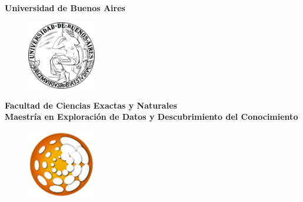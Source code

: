 \documentclass[runningheads,a4paper]{llncs}
\begin{document}
\mainmatter  %


\begin{titlepage}

\begin{center}
    
\textbf{\LARGE{Universidad de Buenos Aires}}
\end{center}
\vspace*{0.15in}


\begin{figure}[htb]
\begin{center}
\includegraphics[width=3cm]{logos/UBAlogo.png}
\end{center}
\end{figure}

\begin{center}
\Large{\textbf{Facultad de Ciencias Exactas y Naturales}}\\
\vspace*{0.1in}
\large{\textbf{Maestría en Exploración de Datos y Descubrimiento del Conocimiento}} \\
\vspace*{0.1in}

\begin{figure}[htb]
\begin{center}
\includegraphics[width=3cm]{logos/dmlogo.png}
\end{center}
\end{figure}


\end{center}
\end{titlepage}
\end{document}
